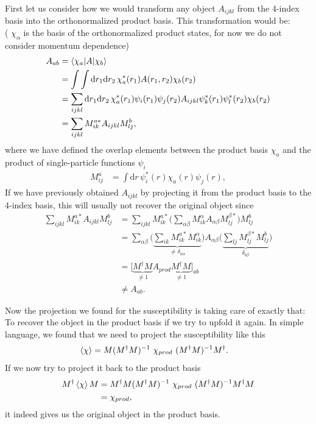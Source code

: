 \documentclass[12pt,a4paper]{scrartcl}
\numberwithin{equation}{section}
\begin{document}
\clearpage

First let us consider how we would transform 
any object $A_{ijkl}$ from the 4-index basis into the orthonormalized product basis. 
This transformation would be:\\
( $\chi_{\alpha}$ is the basis of the orthonormalized product states, for 
now we do not consider momentum dependence)
\begin{align}
A_{ab}
&= \braket{ \chi_a | A | \chi_b } \\
&= \int \int \mathrm{d}r_1 \mathrm{d}r_2 \,  \chi^*_a(r_1)  A(r_1,r_2) \chi_b(r_2) \\
&=\sum_{ijkl} \mathrm{d}r_1 \mathrm{d}r_2 \,  \chi^*_a(r_1)   
    \psi_i(r_1)\psi_j(r_2) A_{ijkl} \psi^*_k(r_1)\psi^*_l(r_2) \chi_b(r_2)  \\
%    
 &= \sum_{ijkl} M_{ik}^{a*}  A_{ijkl} M_{lj}^{b} ,
\end{align}
where we have defined the overlap elements between the product basis $\chi_a$
and the product of single-particle functions $\psi_i$
\begin{align}
M_{ij}^{a}
&= \int  \mathrm{d}r\, \psi^*_i(r) \chi_a(r) \psi_j(r) ,
\end{align}
If we have previously obtained $A_{ijkl}$ by projecting it from the product basis
to the 4-index basis, this will usually not recover the original object since
\begin{align}
 \sum_{ijkl} M_{ik}^{a*}  A_{ijkl} M_{lj}^{b} 
 &= \sum_{ijkl} M_{ik}^{a*} \Big( \sum_{\alpha\beta}  M_{ik}^{\alpha} A_{\alpha\beta} M_{lj}^{\beta*} \Big) M_{lj}^{b}  \\
 &= \sum_{\alpha\beta}  \Big( \underbrace{ \sum_{ik} M_{ik}^{a*} M_{ik}^{\alpha}}_{\neq \delta_{a\alpha}} \Big) A_{\alpha\beta} \Big( \underbrace{ \sum_{lj}M_{lj}^{\beta*}M_{lj}^{b} }_{\delta_{b\beta}} \Big) \\
 &= \Big[ \underbrace{ M^{\dagger} M }_{\neq 1} A_{prod}  \underbrace{ M^{\dagger} M }_{\neq 1} \Big]_{ab} \\
 & \neq A_{ab}.
\end{align}

Now the projection we found for the susceptibility is taking care of exactly that: To recover the 
object in the product basis if we try to upfold it again.
In simple language, we found that we need to project the susceptibility like this
\begin{align}
 \braket{\chi} &=  M ( M^{\dagger} M )^{-1} \ \chi_{prod} \ ( M^{\dagger} M )^{-1} M^{\dagger} .
\end{align}
If we now try to project it back to the product basis
\begin{align}
M^{\dagger}  \braket{\chi} M
 &= M^{\dagger} M ( M^{\dagger} M )^{-1} \ \chi_{prod} \ ( M^{\dagger} M )^{-1} M^{\dagger} M \\
 &= \chi_{prod},
\end{align}
it indeed gives us the original object in the product basis.
\end{document}

